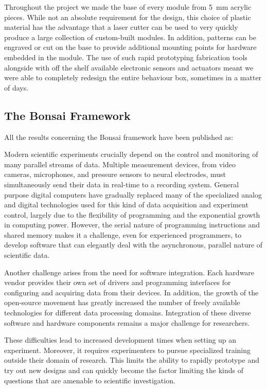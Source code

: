 Throughout the project we made the base of every module from \SI{5}{\milli\meter} acrylic pieces. While not an absolute requirement for the design, this choice of plastic material has the advantage that a laser cutter can be used to very quickly produce a large collection of custom-built modules. In addition, patterns can be engraved or cut on the base to provide additional mounting points for hardware embedded in the module. The use of such rapid prototyping fabrication tools alongside with off the shelf available electronic sensors and actuators meant we were able to completely redesign the entire behaviour box, sometimes in a matter of days.

\subsection{The Bonsai Framework}

All the results concerning the Bonsai framework have been published as:
\bigskip

Modern scientific experiments crucially depend on the control and monitoring of many parallel streams of data. Multiple measurement devices, from video cameras, microphones, and pressure sensors to neural electrodes, must simultaneously send their data in real-time to a recording system. General purpose digital computers have gradually replaced many of the specialized analog and digital technologies used for this kind of data acquisition and experiment control, largely due to the flexibility of programming and the exponential growth in computing power. However, the serial nature of programming instructions and shared memory makes it a challenge, even for experienced programmers, to develop software that can elegantly deal with the asynchronous, parallel nature of scientific data.

Another challenge arises from the need for software integration. Each hardware vendor provides their own set of drivers and programming interfaces for configuring and acquiring data from their devices. In addition, the growth of the open-source movement has greatly increased the number of freely available technologies for different data processing domains. Integration of these diverse software and hardware components remains a major challenge for researchers.

These difficulties lead to increased development times when setting up an experiment. Moreover, it requires experimenters to pursue specialized training outside their domain of research. This limits the ability to rapidly prototype and try out new designs and can quickly become the factor limiting the kinds of questions that are amenable to scientific investigation.

